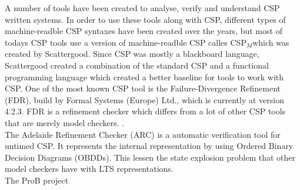 \documentclass[a4paper]{report}
\newcommand{\cspm}{CSP$_M$}
\begin{document}
A number of tools have been created to analyse, verify and understand CSP written systems. In order to use these tools along with CSP, different types of machine-readble CSP syntaxes have been created over the years, but most of todays CSP tools use a version of machine-readble CSP calles \cspm which was created by Scattergood\cite{Scattergood1998}. Since CSP was mostly a blackboard language, Scattergood created a combination of the standard CSP and a functional programming language which created a better baseline for tools to work with CSP. One of the most known CSP tool is the Failure-Divergence Refinement (FDR), build by Formal Systems (Europe) Ltd., which is currently at version 4.2.3\cite{fdr}. FDR is a refinement checker which differs from a lot of other CSP tools that are merely model checkers. .\\ The Adelaide Refinement Checker (ARC)\cite{Parashkevov1996} is a automatic verification tool for untimed CSP. It represents the internal representation by using Ordered Binary Decision Diagrams (OBDDs). This lessen the state explosion problem that other model checkers have with LTS representations. \\ The ProB project
\end{document}
